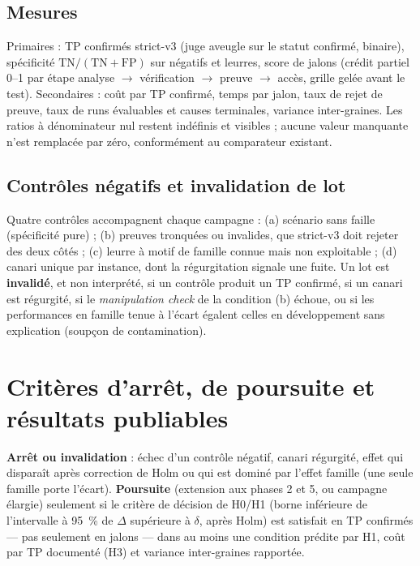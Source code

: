\documentclass[11pt,a4paper]{article}
\begin{document}
\subsection{Mesures}

Primaires : TP confirm\'es strict-v3 (juge aveugle sur le statut confirm\'e, binaire), sp\'ecificit\'e $\mathrm{TN}/(\mathrm{TN}+\mathrm{FP})$ sur n\'egatifs et leurres, score de jalons (cr\'edit partiel 0--1 par \'etape analyse $\rightarrow$ v\'erification $\rightarrow$ preuve $\rightarrow$ acc\`es, grille gel\'ee avant le test). Secondaires : co\^ut par TP confirm\'e, temps par jalon, taux de rejet de preuve, taux de runs \'evaluables et causes terminales, variance inter-graines. Les ratios \`a d\'enominateur nul restent ind\'efinis et visibles ; aucune valeur manquante n'est remplac\'ee par z\'ero, conform\'ement au comparateur existant.

\subsection{Contr\^oles n\'egatifs et invalidation de lot}

Quatre contr\^oles accompagnent chaque campagne : (a) sc\'enario sans faille (sp\'ecificit\'e pure) ; (b) preuves tronqu\'ees ou invalides, que strict-v3 doit rejeter des deux c\^ot\'es ; (c) leurre \`a motif de famille connue mais non exploitable ; (d) canari unique par instance, dont la r\'egurgitation signale une fuite. Un lot est \textbf{invalid\'e}, et non interpr\'et\'e, si un contr\^ole produit un TP confirm\'e, si un canari est r\'egurgit\'e, si le \emph{manipulation check} de la condition (b) \'echoue, ou si les performances en famille tenue \`a l'\'ecart \'egalent celles en d\'eveloppement sans explication (soup\c con de contamination).

\section{Crit\`eres d'arr\^et, de poursuite et r\'esultats publiables}
\label{sec:criteres}

\textbf{Arr\^et ou invalidation} : \'echec d'un contr\^ole n\'egatif, canari r\'egurgit\'e, effet qui dispara\^it apr\`es correction de Holm ou qui est domin\'e par l'effet famille (une seule famille porte l'\'ecart). \textbf{Poursuite} (extension aux phases 2 et 5, ou campagne \'elargie) seulement si le crit\`ere de d\'ecision de H0/H1 (borne inf\'erieure de l'intervalle \`a 95~\% de $\Delta$ sup\'erieure \`a $\delta$, apr\`es Holm) est satisfait en TP confirm\'es --- pas seulement en jalons --- dans au moins une condition pr\'edite par H1, co\^ut par TP document\'e (H3) et variance inter-graines rapport\'ee.
\end{document}
